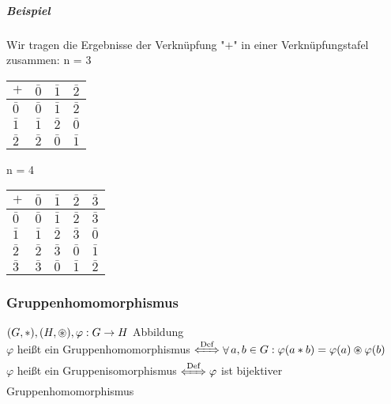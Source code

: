 \documentclass[a4paper]{scrartcl}
\DeclareMathOperator{\Forall}{\forall}
\theoremstyle{definition}
\theoremstyle{plain}
\theoremstyle{plain}
\theoremstyle{remark}
\theoremstyle{remark}
\theoremstyle{remark}
\theoremstyle{remark}
\theoremstyle{remark}
\begin{document}
\subparagraph{Beispiel}
\label{sec-3-1-7-4-2}
Wir tragen die Ergebnisse der Verknüpfung "$+$" in einer Verknüpfungstafel zusammen:
n = 3
\begin{center}
\begin{tabular}{llll}
$+$ & $\bar 0$ & $\bar 1$ & $\bar 2$\\
\hline
$\bar 0$ & $\bar 0$ & $\bar 1$ & $\bar 2$\\
$\bar 1$ & $\bar 1$ & $\bar 2$ & $\bar 0$\\
$\bar 2$ & $\bar 2$ & $\bar 0$ & $\bar 1$\\
\end{tabular}
\end{center}

n = 4
\begin{center}
\begin{tabular}{lllll}
$+$ & $\bar 0$ & $\bar 1$ & $\bar 2$ & $\bar 3$\\
\hline
$\bar 0$ & $\bar 0$ & $\bar 1$ & $\bar 2$ & $\bar 3$\\
$\bar 1$ & $\bar 1$ & $\bar 2$ & $\bar 3$ & $\bar 0$\\
$\bar 2$ & $\bar 2$ & $\bar 3$ & $\bar 0$ & $\bar 1$\\
$\bar 3$ & $\bar 3$ & $\bar 0$ & $\bar 1$ & $\bar 2$\\
\end{tabular}
\end{center}
\subsubsection{Gruppenhomomorphismus}
\label{sec-3-1-8}
$(G,*),(H,\oast), \varphi : G \to H$ Abbildung \\
        $\varphi$ heißt ein Gruppenhomomorphismus $\xLeftrightarrow{\text{Def}} \Forall a,b\in G: \varphi(a*b) = \varphi(a) \oast \varphi(b)$ \\
        $\varphi$ heißt ein Gruppenisomorphismus $\xLeftrightarrow{\text{Def}} \varphi$ ist bijektiver Gruppenhomomorphismus
\end{document}
